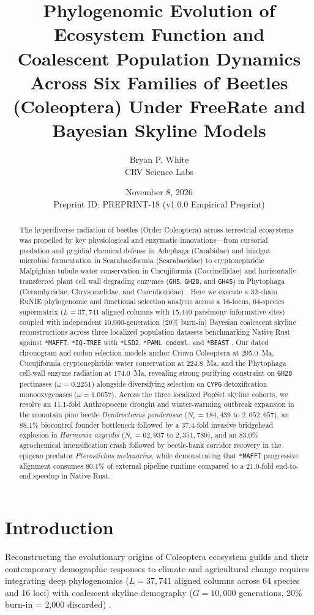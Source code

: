 \documentclass[10pt,letterpaper]{article}
\title{\textbf{Phylogenomic Evolution of Ecosystem Function and Coalescent Population Dynamics Across Six Families of Beetles (Coleoptera) Under FreeRate and Bayesian Skyline Models}}
\author{Bryan P. White \\ CRV Science Labs}
\date{November 8, 2026 \\ \small Preprint ID: PREPRINT-18 (v1.0.0 Empirical Preprint)}
\begin{document}
\maketitle

\begin{abstract}
The hyperdiverse radiation of beetles (Order Coleoptera) across terrestrial ecosystems was propelled by key physiological and enzymatic innovations---from cursorial predation and pygidial chemical defense in Adephaga (Carabidae) and hindgut microbial fermentation in Scarabaeiformia (Scarabaeidae) to cryptonephridic Malpighian tubule water conservation in Cucujiformia (Coccinellidae) and horizontally transferred plant cell wall degrading enzymes (\texttt{GH5}, \texttt{GH28}, and \texttt{GH45}) in Phytophaga (Cerambycidae, Chrysomelidae, and Curculionidae) \cite{White2026RuNIE,McKenna2019,Zhang2018,Kirsch2014}. Here we execute a 32-chain RuNIE phylogenomic and functional selection analysis across a 16-locus, 64-species supermatrix ($L = 37,741$ aligned columns with 15,440 parsimony-informative sites) coupled with independent 10,000-generation (20\% burn-in) Bayesian coalescent skyline reconstructions across three localized population datasets benchmarking Native Rust against \texttt{*MAFFT}, \texttt{*IQ-TREE} with \texttt{*LSD2}, \texttt{*PAML codeml}, and \texttt{*BEAST} \cite{Suchard2018,Katoh2013,Minh2020,To2016,Yang2007}. Our dated chronogram and codon selection models anchor Crown Coleoptera at 295.0~Ma, Cucujiformia cryptonephridic water conservation at 224.8~Ma, and the Phytophaga cell-wall enzyme radiation at 174.0~Ma, revealing strong purifying constraint on \texttt{GH28} pectinases ($\omega = 0.2251$) alongside diversifying selection on \texttt{CYP6} detoxification monooxygenases ($\omega = 1.0657$). Across the three localized PopSet skyline cohorts, we resolve an 11.1-fold Anthropocene drought and winter-warming outbreak expansion in the mountain pine beetle \emph{Dendroctonus ponderosae} ($N_e = 184,439$ to $2,052,657$), an 88.1\% biocontrol founder bottleneck followed by a 37.4-fold invasive bridgehead explosion in \emph{Harmonia axyridis} ($N_e = 62,937$ to $2,351,789$), and an 83.0\% agrochemical intensification crash followed by beetle-bank corridor recovery in the epigean predator \emph{Pterostichus melanarius}, while demonstrating that \texttt{*MAFFT} progressive alignment consumes 80.1\% of external pipeline runtime compared to a 21.0-fold end-to-end speedup in Native Rust.
\end{abstract}

\section{Introduction}
Reconstructing the evolutionary origins of Coleoptera ecosystem guilds and their contemporary demographic responses to climate and agricultural change requires integrating deep phylogenomics ($L = 37,741$ aligned columns across 64 species and 16 loci) with coalescent skyline demography ($G = 10,000$ generations, 20\% burn-in = 2,000 discarded) \cite{White2026RuNIE,McKenna2019,Zhang2018,Lovei1996,Kirsch2014,Busch2019,Suchard2018,Drummond2005,Minin2008}.
\end{document}
